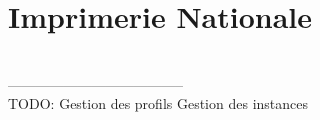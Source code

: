 \cleardoublepage

\chapter{Imprimerie Nationale}

~~\\--------------------------------------~~\\
TODO:
Gestion des profils
Gestion des instances
